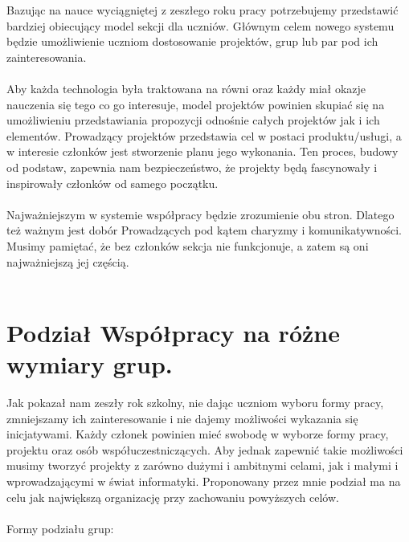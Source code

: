 \documentclass[9pt,a4paper]{report}
\begin{document}
 

Bazując na nauce wyciągniętej z zeszłego roku pracy potrzebujemy przedstawić bardziej obiecujący model sekcji dla uczniów. Głównym celem nowego systemu będzie umożliwienie uczniom dostosowanie projektów, grup lub par pod ich zainteresowania.\\\\ 

Aby każda technologia była traktowana na równi oraz każdy miał okazje nauczenia się tego co go interesuje, model projektów powinien skupiać się na umożliwieniu przedstawiania propozycji odnośnie całych projektów jak i ich elementów. Prowadzący projektów przedstawia cel w postaci produktu/usługi, a w interesie członków jest stworzenie planu jego wykonania. Ten proces, budowy od podstaw, zapewnia nam bezpieczeństwo, że projekty będą fascynowały i inspirowały członków od samego początku.\\\\ 

Najważniejszym w systemie współpracy będzie zrozumienie obu stron. Dlatego też ważnym jest dobór Prowadzących pod kątem charyzmy i komunikatywności. Musimy pamiętać, że bez członków sekcja nie funkcjonuje, a zatem są oni najważniejszą jej częścią. \\\\

 

\section{Podział Współpracy na różne wymiary grup.} 

 

Jak pokazał nam zeszły rok szkolny, nie dając uczniom wyboru formy pracy, zmniejszamy ich zainteresowanie i nie dajemy możliwości wykazania się inicjatywami. Każdy członek powinien mieć swobodę w wyborze formy pracy, projektu oraz osób współuczestniczących. Aby jednak zapewnić takie możliwości musimy tworzyć projekty z zarówno dużymi i ambitnymi celami, jak i małymi i wprowadzającymi w świat informatyki. Proponowany przez mnie podział ma na celu jak największą organizację przy zachowaniu powyższych celów.\\\\ 

Formy podziału grup: 
\end{document}

